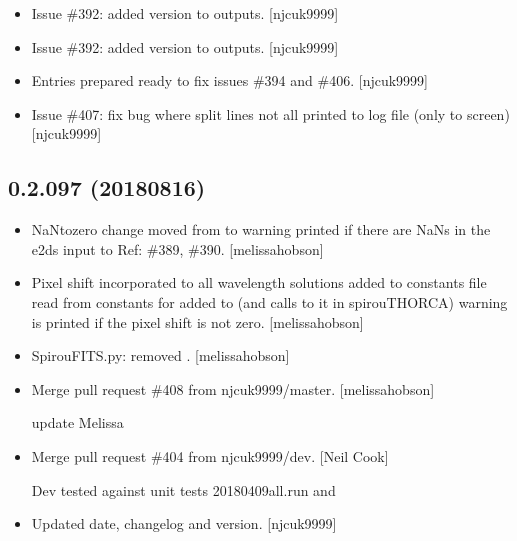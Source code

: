\documentclass[a4paper,10pt,english]{report}
\begin{document}
\begin{itemize}
\item {} 
Issue \#392: added version to outputs. {[}njcuk9999{]}

\item {} 
Issue \#392: added version to outputs. {[}njcuk9999{]}

\item {} 
Entries prepared ready to fix issues \#394 and \#406. {[}njcuk9999{]}

\item {} 
Issue \#407: fix bug where split lines not all printed to log file
(only to screen) {[}njcuk9999{]}

\end{itemize}


\subsection{0.2.097 (2018\sphinxhyphen{}08\sphinxhyphen{}16)}
\label{\detokenize{misc/changelog:id386}}\begin{itemize}
\item {} 
NaN\sphinxhyphen{}to\sphinxhyphen{}zero change moved from  to  \sphinxhyphen{} warning
printed if there are NaNs in the e2ds input to  \sphinxhyphen{} Ref: \#389,
\#390. {[}melissa\sphinxhyphen{}hobson{]}

\item {} 
Pixel shift incorporated to all wavelength solutions \sphinxhyphen{} added to
constants file \sphinxhyphen{} read from constants for  \sphinxhyphen{}
added to  (and calls to it in
spirouTHORCA) \sphinxhyphen{} warning is printed if the pixel shift is not zero.
{[}melissa\sphinxhyphen{}hobson{]}

\item {} 
SpirouFITS.py: removed . {[}melissa\sphinxhyphen{}hobson{]}

\item {} 
Merge pull request \#408 from njcuk9999/master. {[}melissa\sphinxhyphen{}hobson{]}

update Melissa

\item {} 
Merge pull request \#404 from njcuk9999/dev. {[}Neil Cook{]}

Dev \sphinxhyphen{} tested against unit tests 20180409all.run and 

\item {} 
Updated date, changelog and version. {[}njcuk9999{]}

\end{itemize}
\end{document}
